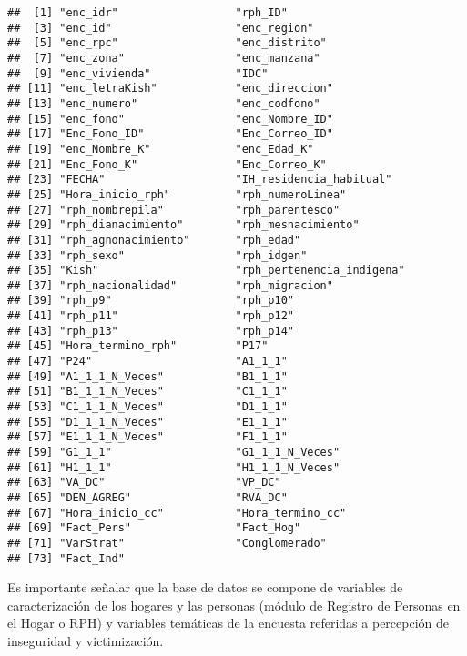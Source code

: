 \documentclass[
]{book}
\theoremstyle{definition}
\theoremstyle{definition}
\theoremstyle{definition}
\theoremstyle{definition}
\theoremstyle{remark}
\begin{document}
\begin{verbatim}
##  [1] "enc_idr"                  "rph_ID"                  
##  [3] "enc_id"                   "enc_region"              
##  [5] "enc_rpc"                  "enc_distrito"            
##  [7] "enc_zona"                 "enc_manzana"             
##  [9] "enc_vivienda"             "IDC"                     
## [11] "enc_letraKish"            "enc_direccion"           
## [13] "enc_numero"               "enc_codfono"             
## [15] "enc_fono"                 "enc_Nombre_ID"           
## [17] "Enc_Fono_ID"              "Enc_Correo_ID"           
## [19] "enc_Nombre_K"             "enc_Edad_K"              
## [21] "Enc_Fono_K"               "Enc_Correo_K"            
## [23] "FECHA"                    "IH_residencia_habitual"  
## [25] "Hora_inicio_rph"          "rph_numeroLinea"         
## [27] "rph_nombrepila"           "rph_parentesco"          
## [29] "rph_dianacimiento"        "rph_mesnacimiento"       
## [31] "rph_agnonacimiento"       "rph_edad"                
## [33] "rph_sexo"                 "rph_idgen"               
## [35] "Kish"                     "rph_pertenencia_indigena"
## [37] "rph_nacionalidad"         "rph_migracion"           
## [39] "rph_p9"                   "rph_p10"                 
## [41] "rph_p11"                  "rph_p12"                 
## [43] "rph_p13"                  "rph_p14"                 
## [45] "Hora_termino_rph"         "P17"                     
## [47] "P24"                      "A1_1_1"                  
## [49] "A1_1_1_N_Veces"           "B1_1_1"                  
## [51] "B1_1_1_N_Veces"           "C1_1_1"                  
## [53] "C1_1_1_N_Veces"           "D1_1_1"                  
## [55] "D1_1_1_N_Veces"           "E1_1_1"                  
## [57] "E1_1_1_N_Veces"           "F1_1_1"                  
## [59] "G1_1_1"                   "G1_1_1_N_Veces"          
## [61] "H1_1_1"                   "H1_1_1_N_Veces"          
## [63] "VA_DC"                    "VP_DC"                   
## [65] "DEN_AGREG"                "RVA_DC"                  
## [67] "Hora_inicio_cc"           "Hora_termino_cc"         
## [69] "Fact_Pers"                "Fact_Hog"                
## [71] "VarStrat"                 "Conglomerado"            
## [73] "Fact_Ind"
\end{verbatim}

Es importante señalar que la base de datos se compone de variables de caracterización de los hogares y las personas (módulo de Registro de Personas en el Hogar o RPH) y variables temáticas de la encuesta referidas a percepción de inseguridad y victimización.
\end{document}
